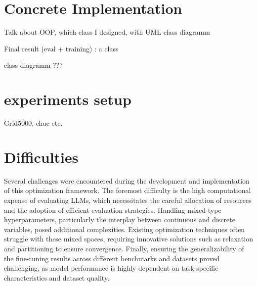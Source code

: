 \section{Concrete Implementation}
\label{sec:concrete_impl}
Talk about OOP, which class I designed, with UML class diagramm

Final result (eval + training) : a class 

class diagramm ???

\section{experiments setup}
\label{sec:exp_setup}

Grid5000, chuc etc.


\section{Difficulties}
\label{sec:opt_difficulties}
Several challenges were encountered during the development and implementation of this optimization framework. The foremost difficulty is the high computational expense of evaluating LLMs, which necessitates the careful allocation of resources and the adoption of efficient evaluation strategies. Handling mixed-type hyperparameters, particularly the interplay between continuous and discrete variables, posed additional complexities. Existing optimization techniques often struggle with these mixed spaces, requiring innovative solutions such as relaxation and partitioning to ensure convergence. Finally, ensuring the generalizability of the fine-tuning results across different benchmarks and datasets proved challenging, as model performance is highly dependent on task-specific characteristics and dataset quality.